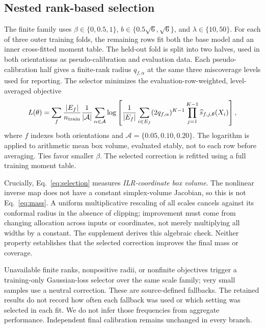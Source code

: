 \documentclass{article}
\begin{document}
\subsection{Nested rank-based selection}
The finite family uses $\beta\in\{0,0.5,1\}$, $b\in\{0.5\sqrt6,\sqrt6\}$, and $\lambda\in\{10,50\}$. For each of three outer training folds, the remaining rows fit both the base model and an inner cross-fitted moment table. The held-out fold is split into two halves, used in both orientations as pseudo-calibration and evaluation data. Each pseudo-calibration half gives a finite-rank radius $q_{f,\alpha}$ at the same three miscoverage levels used for reporting. The selector minimizes the evaluation-row-weighted, level-averaged objective
\begin{equation}
 L(\theta)=\sum_f\frac{|E_f|}{n_{\rm train}}\frac{1}{|\mathcal A|}
 \sum_{\alpha\in\mathcal A}\log\left[
 \frac1{|E_f|}\sum_{i\in E_f}(2q_{f,\alpha})^{K-1}
 \prod_{j=1}^{K-1}\widehat s_{f,j,\theta}(X_i)\right],
 \label{eq:selection}
\end{equation}
where $f$ indexes both orientations and $\mathcal A=\{0.05,0.10,0.20\}$. The logarithm is applied to arithmetic mean box volume, evaluated stably, not to each row before averaging. Ties favor smaller $\beta$. The selected correction is refitted using a full training moment table. %

Crucially, Eq.~\eqref{eq:selection} measures \emph{ILR-coordinate box volume}. The nonlinear inverse map does not have a constant simplex-volume Jacobian, so this is not Eq.~\eqref{eq:mass}. A uniform multiplicative rescaling of all scales cancels against its conformal radius in the absence of clipping; improvement must come from changing allocation across inputs or coordinates, not merely multiplying all widths by a constant. The supplement derives this algebraic check. Neither property establishes that the selected correction improves the final mass or coverage.

Unavailable finite ranks, nonpositive radii, or nonfinite objectives trigger a training-only Gaussian-loss selector over the same scale family; very small samples use a neutral correction. These are source-defined fallbacks. The retained results do not record how often each fallback was used or which setting was selected in each fit. We do not infer those frequencies from aggregate performance. Independent final calibration remains unchanged in every branch. %
\end{document}
